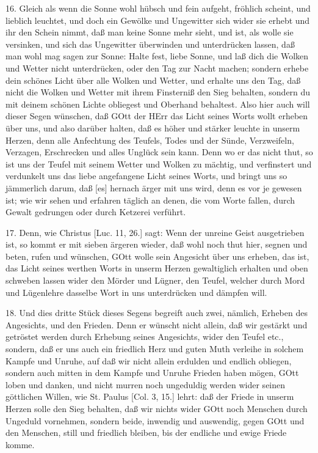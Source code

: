 16. Gleich als wenn die Sonne wohl hübsch und fein aufgeht, fröhlich scheint, und lieblich leuchtet, und doch ein Gewölke und Ungewitter sich wider sie erhebt und ihr den Schein nimmt, daß man keine Sonne mehr sieht, und ist, als wolle sie versinken, und sich das Ungewitter überwinden und unterdrücken lassen, daß man wohl mag sagen zur Sonne: Halte fest, liebe Sonne, und laß dich die Wolken und Wetter nicht unterdrücken, oder den Tag zur Nacht machen; sondern erhebe dein schönes Licht über alle Wolken und Wetter, und erhalte uns den Tag, daß nicht die Wolken und Wetter mit ihrem Finsterniß den Sieg behalten, sondern du mit deinem schönen Lichte obliegest und Oberhand behaltest. Also hier auch will dieser Segen wünschen, daß GOtt der HErr das Licht seines Worts wollt erheben über uns, und also darüber halten, daß
es höher und stärker leuchte in unserm Herzen, denn alle Anfechtung des Teufels, Todes und der Sünde, Verzweifeln, Verzagen, Erschrecken und alles Unglück sein kann. Denn wo er das nicht thut, so ist uns der Teufel mit seinem Wetter und Wolken zu mächtig, und verfinstert und verdunkelt uns das liebe angefangene Licht seines Worts, und bringt uns so jämmerlich darum, daß [es] hernach ärger mit uns wird, denn es vor je gewesen ist; wie wir sehen und erfahren täglich an denen, die vom Worte fallen, durch Gewalt gedrungen oder durch Ketzerei verführt.

17. Denn, wie Christus [Luc. 11, 26.] sagt: Wenn der unreine Geist ausgetrieben ist, so kommt er mit sieben ärgeren wieder, daß wohl noch thut hier, segnen und beten, rufen und wünschen, GOtt wolle sein Angesicht über uns erheben, das ist, das Licht seines werthen Worts in unserm Herzen gewaltiglich erhalten und oben schweben lassen wider den Mörder und Lügner, den Teufel, welcher durch Mord und Lügenlehre dasselbe Wort in uns unterdrücken und dämpfen will.

18. Und dies dritte Stück dieses Segens begreift auch zwei, nämlich, Erheben des Angesichts, und den Frieden. Denn er wünscht nicht allein, daß wir gestärkt und getröstet werden durch Erhebung seines Angesichts, wider den Teufel etc., sondern, daß er uns auch ein friedlich Herz und guten Muth verleihe in solchem Kampfe und Unruhe, auf daß wir nicht allein erdulden und endlich obliegen, sondern auch mitten in dem Kampfe und Unruhe Frieden haben mögen, GOtt loben und danken, und nicht murren noch ungeduldig werden wider seinen göttlichen Willen, wie St. Paulus [Col. 3, 15.] lehrt: daß der Friede in unserm Herzen solle den Sieg behalten, daß wir nichts wider GOtt noch Menschen durch Ungeduld vornehmen, sondern beide, inwendig und auswendig, gegen GOtt und den Menschen, still und friedlich bleiben, bis der endliche und ewige Friede komme.


